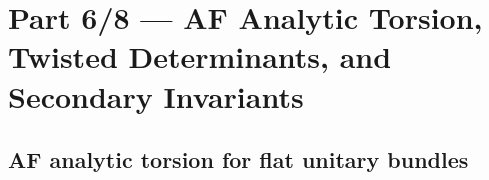 
\section*{Part 6/8 — AF Analytic Torsion, Twisted Determinants, and Secondary Invariants}
\relax\hspace{0pt}

\subsection{AF analytic torsion for flat unitary bundles}
\label{subsec:af-torsion}
\relax\hspace{0pt}


